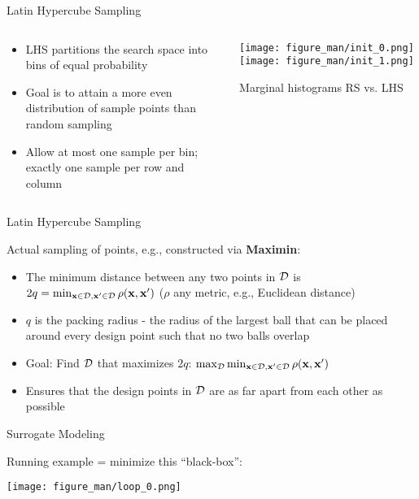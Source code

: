 \documentclass[11pt,compress,t,notes=noshow, xcolor=table]{beamer}
\begin{document}
\begin{frame}{Latin Hypercube Sampling}

\begin{columns}[T]
\begin{column}{0.5\textwidth}
\begin{itemize}
\item LHS partitions the search space into bins of equal probability
\item Goal is to attain a more even distribution of sample points than random sampling
\item Allow at most one sample per bin; exactly one sample per row and column
\end{itemize}
\end{column}

\begin{column}{0.5\textwidth}
\center
\texttt{[image: figure\_man/init\_0.png]}
\texttt{[image: figure\_man/init\_1.png]}\\
\begin{footnotesize}
Marginal histograms RS vs. LHS
\end{footnotesize}
\end{column}
\end{columns}

\end{frame}

\begin{frame}{Latin Hypercube Sampling}

Actual sampling of points, e.g., constructed via \textbf{Maximin}:\\
\begin{itemize}
\item The minimum distance between any two points in $\mathcal{D}$ is $2q = \min_{\mathbf{x} \in \mathcal{D}, \mathbf{x}' \in \mathcal{D}} \rho(\mathbf{x}, \mathbf{x}')$ ($\rho$ any metric, e.g., Euclidean distance)
\item $q$ is the packing radius - the radius of the largest ball that can be placed around every design point such that no two balls overlap
\item Goal: Find $\mathcal{D}$ that maximizes $2q$: $\max_{\mathcal{D}} \min_{\mathbf{x} \in \mathcal{D}, \mathbf{x}' \in \mathcal{D}} \rho(\mathbf{x}, \mathbf{x}')$
\item Ensures that the design points in $\mathcal{D}$ are as far apart from each other as possible
\end{itemize}

\end{frame}

\begin{frame}{Surrogate Modeling}

Running example = minimize this \enquote{black-box}:

\begin{center}
  \texttt{[image: figure\_man/loop\_0.png]}
\end{center}

\end{frame}
\end{document}
